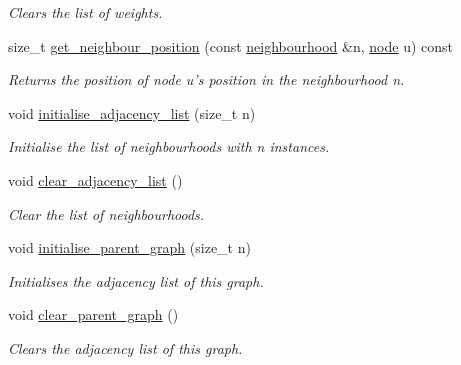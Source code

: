 \begin{DoxyCompactItemize}
\begin{DoxyCompactList}\small\item\em Clears the list of weights. \end{DoxyCompactList}\item 
size\-\_\-t \hyperlink{classlgraph_1_1xxgraph_a8c176b1d19cf8d0b299c419e325df21d}{get\-\_\-neighbour\-\_\-position} (const \hyperlink{namespacelgraph_a052e7766c13f3a43cec0aec8173fdede}{neighbourhood} \&n, \hyperlink{namespacelgraph_a397169dd66adf725210a30fb7251773e}{node} u) const 
\begin{DoxyCompactList}\small\item\em Returns the position of node {\itshape u's} position in the neighbourhood {\itshape n}. \end{DoxyCompactList}\item 
\hypertarget{classlgraph_1_1xxgraph_a682d586f850add8b7e637aeea81b0292}{void \hyperlink{classlgraph_1_1xxgraph_a682d586f850add8b7e637aeea81b0292}{initialise\-\_\-adjacency\-\_\-list} (size\-\_\-t n)}\label{classlgraph_1_1xxgraph_a682d586f850add8b7e637aeea81b0292}

\begin{DoxyCompactList}\small\item\em Initialise the list of neighbourhoods with {\itshape n} instances. \end{DoxyCompactList}\item 
\hypertarget{classlgraph_1_1xxgraph_a6b15c62c68919722f7eb18fe273d45fe}{void \hyperlink{classlgraph_1_1xxgraph_a6b15c62c68919722f7eb18fe273d45fe}{clear\-\_\-adjacency\-\_\-list} ()}\label{classlgraph_1_1xxgraph_a6b15c62c68919722f7eb18fe273d45fe}

\begin{DoxyCompactList}\small\item\em Clear the list of neighbourhoods. \end{DoxyCompactList}\item 
void \hyperlink{classlgraph_1_1xxgraph_a50c658dd39e6b1d38bf7e514daa2f33c}{initialise\-\_\-parent\-\_\-graph} (size\-\_\-t n)
\begin{DoxyCompactList}\small\item\em Initialises the adjacency list of this graph. \end{DoxyCompactList}\item 
void \hyperlink{classlgraph_1_1xxgraph_a4122495066e4402cbf6d2d9bb82d54cc}{clear\-\_\-parent\-\_\-graph} ()
\begin{DoxyCompactList}\small\item\em Clears the adjacency list of this graph. \end{DoxyCompactList}\end{DoxyCompactItemize}
